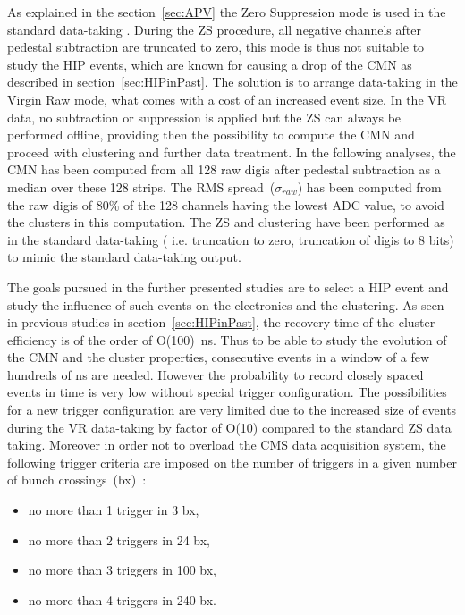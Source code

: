 As explained in the section~\ref{sec:APV} the Zero Suppression mode is used in the standard data-taking . During the ZS procedure, all negative channels after pedestal subtraction are truncated to zero, this mode is thus not suitable to study the HIP events, which are known for causing a drop of the CMN as described in section~\ref{sec:HIPinPast}. The solution is to arrange data-taking in the Virgin Raw mode, what comes with a cost of an increased event size. In the VR data, no subtraction or suppression is applied but the ZS can always be performed offline, providing then the possibility to compute the CMN and proceed with clustering and further data treatment. In the following analyses, the CMN has been computed from all 128 raw digis after pedestal subtraction as a median over these 128 strips. The RMS spread~($\sigma_{raw}$) has been computed from the raw digis of 80\% of the 128 channels having the lowest ADC value, to avoid the clusters in this computation. The ZS and clustering have been performed as in the standard data-taking ( i.e. truncation to zero, truncation of digis to 8 bits) to mimic the standard data-taking output.

The goals pursued in the further presented studies are to select a HIP event and study the influence of such events on the electronics and the clustering. As seen in previous studies in section~\ref{sec:HIPinPast}, the recovery time of the cluster efficiency is of the order of O(100)~ns. Thus to be able to study the evolution of the CMN and the cluster properties, consecutive events in a window of a few hundreds of ns are needed. However the probability to record closely spaced events in time is very low without special trigger configuration. The possibilities for a new trigger configuration are very limited due to the increased size of events during the VR data-taking by factor of O(10) compared to the standard ZS data taking. Moreover in order not to overload the CMS data acquisition system, the following trigger criteria are imposed on the number of triggers in a given number of bunch crossings~(bx)~\cite{website:VRtrigger}:

\begin{itemize}
\item{no more than 1 trigger in 3 bx,}
\item{no more than 2 triggers in 24 bx,}
\item{no more than 3 triggers in 100 bx,}
\item{no more than 4 triggers in 240 bx.}
\end{itemize}

